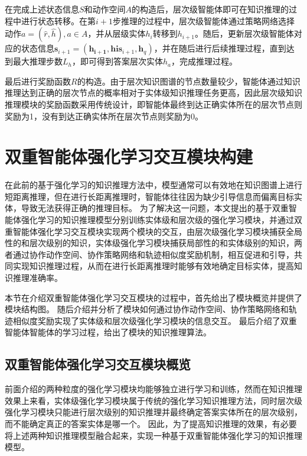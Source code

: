 \documentclass[algorithmlist, AutoFakeBold, AutoFakeSlant, figurelist, tablelist, nomlist, engineering]{seuthesix}
\begin{document}
在完成上述状态信息$S$和动作空间$A$的构造后，层次级智能体即可在知识推理的过程中进行状态转移。在第$i+1$步推理的过程中，层次级智能体通过策略网络选择动作$a = (\hat{r}, \hat{h}), a \in A$，并从层级实体$h_i$转移到$h_{i+1}$。随后，更新层次级智能体对应的状态信息$\bm{s}_{i+1} = (\bm{h_{i+1}}, \bm{his}_{i+1}, \bm{h}_q)$，并在随后进行后续推理过程，直到达到最大推理步数$L_h$，即可得到答案层次实体$h_a$，完成推理过程。

最后进行奖励函数$R$的构造。由于层次知识图谱的节点数量较少，智能体通过知识推理达到正确的层次节点的概率相对于实体级知识推理任务更高，因此层次级知识推理模块的奖励函数采用传统设计，即智能体最终到达正确实体所在的层次节点则奖励为1，没有到达正确实体所在层次节点则奖励为0。

\section{双重智能体强化学习交互模块构建}
在此前的基于强化学习的知识推理方法中，模型通常可以有效地在知识图谱上进行短距离推理，但在进行长距离推理时，智能体往往因为缺少引导信息而偏离目标实体，导致无法获得正确的推理目标。
为了解决这一问题，本文提出的基于双重智能体强化学习的知识推理模型分别训练实体级和层次级的强化学习模块，并通过双重智能体强化学习交互模块实现两个模块的交互，由层次级强化学习模块捕获全局性的和层次级别的知识，实体级强化学习模块捕获局部性的和实体级别的知识，两者通过协作动作空间、协作策略网络和轨迹相似度奖励机制，相互促进和引导，共同实现知识推理过程，从而在进行长距离推理时能够有效地确定目标实体，提高知识推理准确率。

本节在介绍双重智能体强化学习交互模块的过程中，首先给出了模块概览并提供了模块结构图。
随后介绍并分析了模块如何通过协作动作空间、协作策略网络和轨迹相似度奖励实现了实体级和层次级强化学习模块的信息交互。
最后介绍了双重智能体智能体的学习过程，给出了模块的知识推理算法。

\subsection{双重智能体强化学习交互模块概览}
前面介绍的两种粒度的强化学习模块均能够独立进行学习和训练，然而在知识推理效果上来看，实体级强化学习模块属于传统的强化学习知识推理方法，同时层次级强化学习模块只能进行层次级别的知识推理并最终确定答案实体所在的层次级别，而不能确定真正的答案实体是哪一个。
因此，为了提高知识推理的效果，有必要将上述两种知识推理模型融合起来，实现一种基于双重智能体强化学习的知识推理模型。
\end{document}
